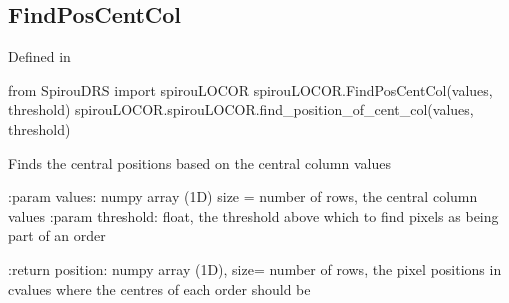 \noindent\begin{minipage}{\textwidth}
\subsection{FindPosCentCol}

Defined in \spirouLOCOR{}

\begin{pythonbox}
from SpirouDRS import spirouLOCOR
spirouLOCOR.FindPosCentCol(values, threshold)
spirouLOCOR.spirouLOCOR.find_position_of_cent_col(values, threshold)
\end{pythonbox}

\begin{pythondocstring}
Finds the central positions based on the central column values

:param values: numpy array (1D) size = number of rows,
                the central column values
:param threshold: float, the threshold above which to find pixels as being
                  part of an order

:return position: numpy array (1D), size= number of rows,
                  the pixel positions in cvalues where the centres of each
                  order should be
\end{pythondocstring}
\end{minipage}

